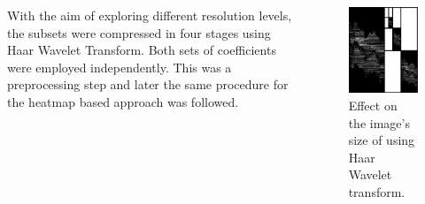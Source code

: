 \documentclass{beamer}
\begin{document}
\begin{frame}

\begin{columns}
\begin{center}
With the aim of exploring different resolution levels, the subsets were compressed in four stages using Haar Wavelet Transform. Both sets of coefficients were employed independently. This was a preprocessing step and later the same procedure for the heatmap based approach was followed.
\end{center}
\begin{figure}
		\centering
			\includegraphics[scale=0.5]{wavelets2.png}
		\caption{Effect on the image's size of using Haar Wavelet transform.}
		\label{fig:wavelets2}
	\end{figure}
\end{columns}
\end{frame}
\end{document}
